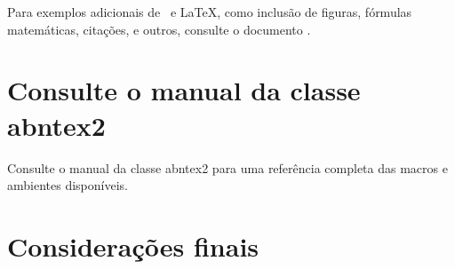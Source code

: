 Para exemplos adicionais de \abnTeX\ e \LaTeX, como inclusão de figuras,
fórmulas matemáticas, citações, e outros, consulte o documento
.

\section{Consulte o manual da classe \textsf{abntex2}}

Consulte o manual da classe \textsf{abntex2} \cite{abntex2classe} para uma
referência completa das macros e ambientes disponíveis.

% 

\section*{Considerações finais}

\lipsum[1]

\begin{citacao}
	\lipsum[2]
\end{citacao}

\lipsum[3]



